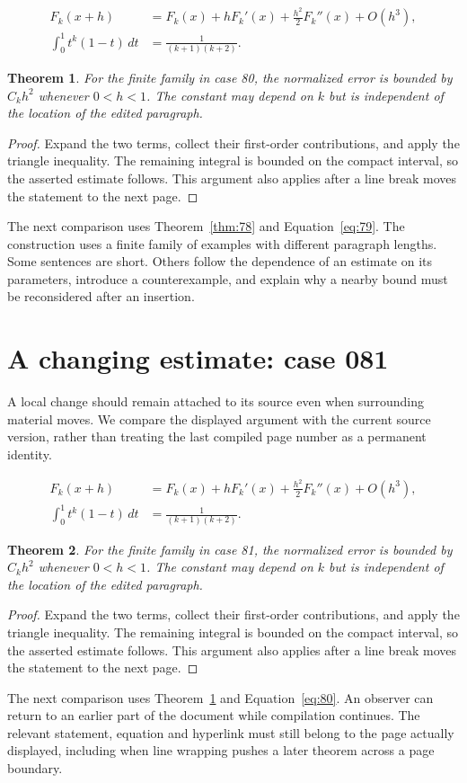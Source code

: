 \documentclass[a4paper,10pt]{article}
\newtheorem{theorem}{Theorem}[section]
\begin{document}
\lipsum[28-29]
\begin{align}\label{eq:79}
 F_k(x+h)&=F_k(x)+hF_k'(x)+\frac{h^2}{2}F_k''(x)+O(h^3),\\
 \int_0^1 t^k(1-t)\,dt&=\frac{1}{(k+1)(k+2)}.
\end{align}
\begin{theorem}\label{thm:79}
For the finite family in case 80, the normalized error is bounded by $C_k h^2$ whenever $0<h<1$. The constant may depend on $k$ but is independent of the location of the edited paragraph.
\end{theorem}
\begin{proof}
Expand the two terms, collect their first-order contributions, and apply the
triangle inequality. The remaining integral is bounded on the compact interval,
so the asserted estimate follows. This argument also applies after a line break
moves the statement to the next page.
\end{proof}
The next comparison uses Theorem~\ref{thm:78} and Equation~\ref{eq:79}. The construction uses a finite family of examples with different paragraph lengths. Some sentences are short. Others follow the dependence of an estimate on its parameters, introduce a counterexample, and explain why a nearby bound must be reconsidered after an insertion.

\lipsum[23]

\section{A changing estimate: case 081}\label{unit:80}
A local change should remain attached to its source even when surrounding material moves. We compare the displayed argument with the current source version, rather than treating the last compiled page number as a permanent identity.

\lipsum[1-2]
\begin{align}\label{eq:80}
 F_k(x+h)&=F_k(x)+hF_k'(x)+\frac{h^2}{2}F_k''(x)+O(h^3),\\
 \int_0^1 t^k(1-t)\,dt&=\frac{1}{(k+1)(k+2)}.
\end{align}
\begin{theorem}\label{thm:80}
For the finite family in case 81, the normalized error is bounded by $C_k h^2$ whenever $0<h<1$. The constant may depend on $k$ but is independent of the location of the edited paragraph.
\end{theorem}
\begin{proof}
Expand the two terms, collect their first-order contributions, and apply the
triangle inequality. The remaining integral is bounded on the compact interval,
so the asserted estimate follows. This argument also applies after a line break
moves the statement to the next page.
\end{proof}
The next comparison uses Theorem~\ref{thm:79} and Equation~\ref{eq:80}. An observer can return to an earlier part of the document while compilation continues. The relevant statement, equation and hyperlink must still belong to the page actually displayed, including when line wrapping pushes a later theorem across a page boundary.
\end{document}
